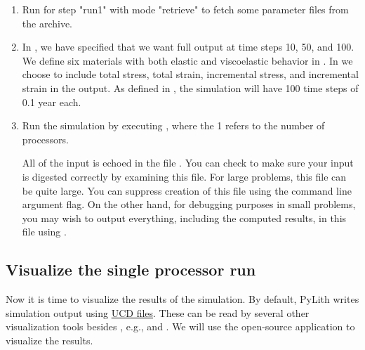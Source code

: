 \begin{enumerate}
\item Run  for step "run1" with mode "retrieve" to
  fetch some parameter files from the archive.

  \begin{screen}
    \shellprompt{}
  \end{screen}
  
\item In , we have specified that we want
  full output at time steps 10, 50, and 100. We define six materials
  with both elastic and viscoelastic behavior in
  . In  we choose to
  include total stress, total strain, incremental stress, and
  incremental strain in the output. As defined in
  , the simulation will have 100 time steps of
  0.1 year each.
\item Run the simulation by executing , where
  the 1 refers to the number of processors.

  \begin{tip}
    All of the input is echoed in the file .
    You can check to make sure your input is digested correctly by
    examining this file. For large problems, this file can be quite
    large. You can suppress creation of this file using the command
    line argument  flag. On the
    other hand, for debugging purposes in small problems, you may wish
    to output everything, including the computed results, in this file
    using .
  \end{tip}
  
  \begin{screen}
    \shellprompt{}
  \end{screen}
\end{enumerate}

\subsection{Visualize the single processor run}

Now it is time to visualize the results of the simulation. By default,
PyLith writes simulation output using
\href{http://help.avs.com/Express/doc/help/reference/dvmac/UCD\_Form.htm}{
  UCD files}.  These can be read by several other visualization tools
besides , e.g.,  and
. We will use the open-source application
 to visualize the results.
    

